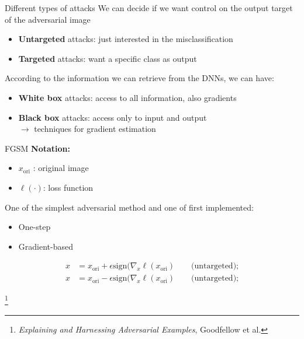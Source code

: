 \documentclass{beamer}
\theoremstyle{plain}
\theoremstyle{definition}
\newcommand\blfootnote[1]{%
  \begingroup
  \renewcommand\thefootnote{}\footnote{#1}%
  \addtocounter{footnote}{-1}%
  \endgroup
}
\begin{document}
\begin{frame}{Different types of attacks}
We can decide if we want control on the output target of the adversarial image
    \begin{itemize}
        \item \textbf{Untargeted} attacks: just interested in the misclassification 
        \item \textbf{Targeted} attacks: want a specific  class as output 
    \end{itemize} 
\medskip
According to the information we can retrieve from the DNNs, we can have: 
\begin{itemize}
    \item \textbf{White box} attacks: access to all information, also gradients 
    \item \textbf{Black box} attacks: access only to input and output \\$\to$ techniques for gradient estimation 
\end{itemize}
\end{frame}

\begin{frame}{FGSM}
\textbf{Notation: }
\begin{itemize}
    \item  $x_\text{ori}$ : original image
    \item $\ell(\cdot)$: loss function
\end{itemize}

\bigskip
One of the simplest adversarial method and one of first implemented: 
\begin{itemize}
    \item One-step 
    \item Gradient-based 
\end{itemize}
\begin{align*}
    x &= x_\text{ori} + \epsilon \text{sign}(\nabla_x \ell(x_\text{ori}) \qquad \text{(untargeted);} \\
    x &= x_\text{ori} - \epsilon \text{sign}(\nabla_x \ell(x_\text{ori}) \qquad \text{(untargeted);}
\end{align*}

\blfootnote{\textit{Explaining and Harnessing Adversarial Examples}, Goodfellow et al. }
    
\end{frame}
\end{document}
